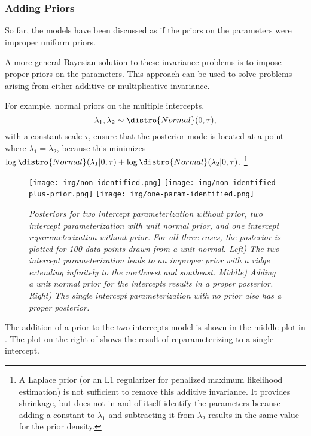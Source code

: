 \subsubsection{Adding Priors}

So far, the models have been discussed as if the priors on the
parameters were improper uniform priors.  

A more general Bayesian solution to these invariance problems is to
impose proper priors on the parameters.  This approach can be used to
solve problems arising from either additive or multiplicative
invariance.

For example, normal priors on the multiple intercepts,
\[
\lambda_1, \lambda_2 \sim \distro{Normal}(0,\tau),
\]
with a constant scale $\tau$, ensure that the posterior mode is
located at a point where $\lambda_1 = \lambda_2$, because this
minimizes $\log \distro{Normal}(\lambda_1|0,\tau) + \log
\distro{Normal}(\lambda_2|0,\tau)$.%
%
\footnote{A Laplace prior (or an L1 regularizer for penalized maximum
  likelihood estimation) is not sufficient to remove this additive
  invariance.  It provides shrinkage, but does not in and of itself
  identify the parameters because adding a constant to $\lambda_1$ and
  subtracting it from $\lambda_2$ results in the same value for the
  prior density.}
%
\begin{figure}
\texttt{[image: img/non-identified.png]}%
\texttt{[image: img/non-identified-plus-prior.png]}%
\texttt{[image: img/one-param-identified.png]}
\vspace*{-.1in}
\caption{\small\it Posteriors for two intercept parameterization
  without prior, two intercept parameterization with unit normal
  prior, and one intercept reparameterization without prior.  For all
  three cases, the posterior is plotted for 100 data points drawn from
  a unit normal. Left) The two intercept parameterization leads to an
  improper prior with a ridge extending infinitely to the northwest
  and southeast.  Middle) Adding a unit normal prior for the
  intercepts results in a proper posterior.  Right) The single
  intercept parameterization with no prior also has a proper posterior.}%
\label{non-identifiable-density.figure}
\end{figure}
%
The addition of a prior to the two intercepts model is shown in the
middle plot in .  The plot on
the right of  shows the result of
reparameterizing to a single intercept.

